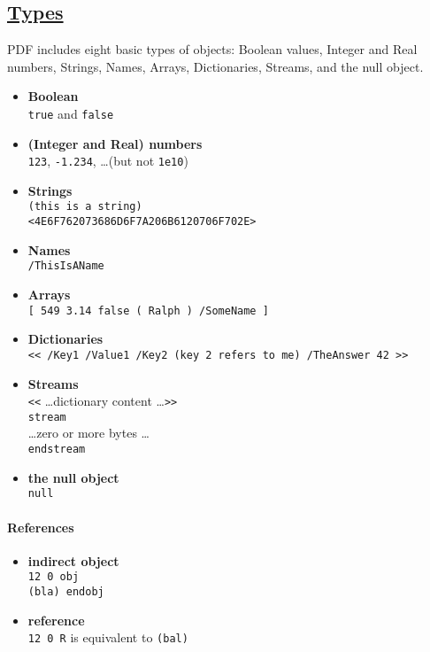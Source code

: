 \documentclass[a4paper,10pt]{article}
\newcommand\pdfref[2]{\href{\pdfspecfile\##1}{#2}}
\begin{document}
\newpage
\subsection{\pdfref{G6.1953078}{Types}}
PDF includes eight basic types of objects: Boolean values, Integer and Real numbers, Strings, Names, Arrays, Dictionaries, Streams, and the null object.

\begin{itemize}
  \item \textbf{Boolean}\\
  \texttt{true} and \texttt{false}
  \item \textbf{(Integer and Real) numbers}\\
  \texttt{123}, \texttt{-1.234}, \ldots (but not \texttt{1e10})
  \item \textbf{Strings}\\
  \texttt{(this is a string)}\\
  \texttt{<4E6F762073686D6F7A206B6120706F702E>}
  \item \textbf{Names}\\
  \texttt{/ThisIsAName}
  \item \textbf{Arrays}\\
  \texttt{[ 549  3.14  false  (  Ralph )   /SomeName ]}
  \item \textbf{Dictionaries}\\
  \texttt{<< /Key1 /Value1 /Key2 (key 2 refers to me) /TheAnswer 42 >>}
  \item \textbf{Streams}\\
  \texttt{<<} \ldots dictionary content \ldots \texttt{>>}\\
  \texttt{stream}\\
  \ldots zero or more bytes \ldots\\
  \texttt{endstream}
  \item \textbf{the null object}\\
  \texttt{null}
\end{itemize}

\paragraph{References}
\begin{itemize}
  \item \textbf{indirect object}\\
  \texttt{12 0 obj\\
  (bla)
  endobj}
  \item \textbf{reference}\\
  \texttt{12 0 R} is equivalent to \texttt{(bal)}
\end{itemize}
\end{document}
